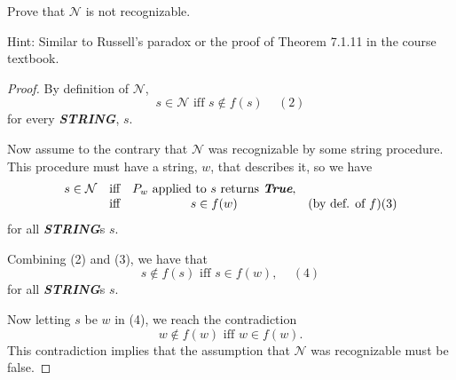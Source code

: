 \documentclass[14pt]{extarticle}
\newcommand{\str}[1]{\textit{\textbf{#1}}}
\begin{document}
Prove that $\mathcal{N}$ is not recognizable.

Hint: Similar to Russell's paradox or the proof of Theorem 7.1.11 in the course textbook.
\begin{proof}
By definition of $\mathcal{N}$,
$$
s \in \mathcal{N} \text{ iff } s \notin f(s) \,\,\,\,\,\,\,(2)
$$
for every \str{STRING}, $s$.

Now assume to the contrary that $\mathcal{N}$ was recognizable by some string procedure. This procedure must have a string, $w$, that describes it, so we have
$$
\begin{array}{cccc}
s \in \mathcal{N} & \text{iff} & P_w \text{ applied to } s \text{ returns } \str{True}, & \\
& \text{iff} & s \in f(w) & \text{(by def. of $f$)(3)}
\end{array}
$$
for all \str{STRING}s $s$.

Combining (2) and (3), we have that
$$
s \notin f (s) \text{ iff } s\in f(w),\,\,\,\,\,\,\,(4)
$$
for all \str{STRING}s $s$.

Now letting $s$ be $w$ in (4), we reach the contradiction
$$
w \notin f(w) \text{ iff } w \in f(w).
$$
This contradiction implies that the assumption that $\mathcal{N}$ was recognizable must be false.
\end{proof}
\end{document}
